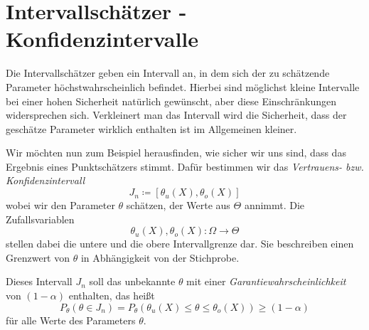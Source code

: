 
\section{Intervallschätzer - Konfidenzintervalle}
Die Intervallschätzer geben ein Intervall an, in dem sich der zu schätzende Parameter höchstwahrscheinlich befindet. Hierbei sind möglichst kleine Intervalle bei einer hohen Sicherheit natürlich gewünscht, aber diese Einschränkungen widersprechen sich. 
Verkleinert man das Intervall wird die Sicherheit, dass der geschätze Parameter wirklich enthalten ist im Allgemeinen kleiner.

Wir möchten nun zum Beispiel herausfinden, wie sicher wir uns sind, dass das Ergebnis eines Punktschätzers stimmt. Dafür bestimmen wir das \emph{Vertrauens- bzw. Konfidenzintervall}
\begin{equation*}
	J_n\coloneqq [\theta_u(X),\theta_o(X)]
\end{equation*}
wobei wir den Parameter $\theta$ schätzen, der Werte aus $\Theta$ annimmt. Die Zufallsvariablen 
\begin{equation*}
	\theta_u(X),\theta_o(X): \Omega\rightarrow \Theta
\end{equation*}
stellen dabei die untere und die obere Intervallgrenze dar. Sie beschreiben einen Grenzwert von $\theta$ in Abhängigkeit von der Stichprobe.

Dieses Intervall $J_n$ soll das unbekannte $\theta$ mit einer \emph{Garantiewahrscheinlichkeit} von $(1-\alpha)$ enthalten, das heißt
\begin{equation*}
	P_\theta (\theta\in J_n)=P_\theta(\theta_u(X)\leq \theta\leq \theta_o(X))\geq (1-\alpha)
\end{equation*}
für alle Werte des Parameters $\theta$.

